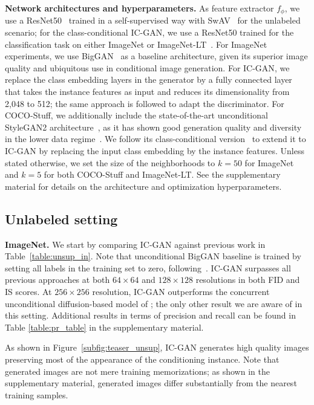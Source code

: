 \textbf{Network architectures and hyperparameters.} As  feature extractor $f_{\phi}$, we use a ResNet50~\cite{he2016deep} trained in a  self-supervised way with SwAV~\cite{caron2020unsupervised} for the unlabeled scenario; for the class-conditional {IC-GAN}, we use a ResNet50 trained for the classification task on either ImageNet or ImageNet-LT~\cite{kang2019decoupling}. For ImageNet experiments, we use BigGAN~\cite{brock2018large} as a baseline architecture, given its superior image quality and ubiquitous use in conditional image generation. For {IC-GAN}, we replace the class embedding layers in the generator by a fully connected layer that takes the instance features as input and reduces its dimensionality from 2,048 to 512; the same approach is followed to adapt the discriminator. For COCO-Stuff, we additionally include the state-of-the-art unconditional StyleGAN2 architecture~\cite{Karras2019stylegan2}, as it has shown good generation quality and diversity in the lower data regime~\cite{karras2020training,Karras2019stylegan2}. We follow its class-conditional version~\cite{karras2020training} to  extend it to {IC-GAN} by replacing the input class embedding by the instance features. Unless stated otherwise, we set the size of the neighborhoods to $k\!=\!50$ for ImageNet and $k\!=\!5$ for both COCO-Stuff and ImageNet-LT. See the supplementary material for details on the architecture and optimization hyperparameters.

\subsection{Unlabeled setting}
\label{sec:unsup}

\textbf{ImageNet.}
We start by comparing {IC-GAN} against previous work in Table~\ref{table:unsup_in}. Note that unconditional BigGAN baseline is trained by setting all labels in the training set to zero, following~\cite{pmlr-v97-lucic19a,noroozi2020self}. {IC-GAN} surpasses all previous approaches at both $64\!\times\!64$ and $128\!\times\!128$ resolutions in both FID and IS scores. At $256\!\times\!256$ resolution, {IC-GAN} outperforms the concurrent unconditional diffusion-based model of \cite{dhariwal21arxiv}; the only other result  we are aware of in this setting. Additional results in terms of precision and recall can be found in Table \ref{table:pr_table} in the supplementary material.

As shown in Figure~\ref{subfig:teaser_unsup}, {IC-GAN} generates high quality images preserving most of the appearance of the conditioning instance. Note that generated images are not mere training memorizations; as shown in the supplementary material, generated images differ substantially from the nearest training samples.

